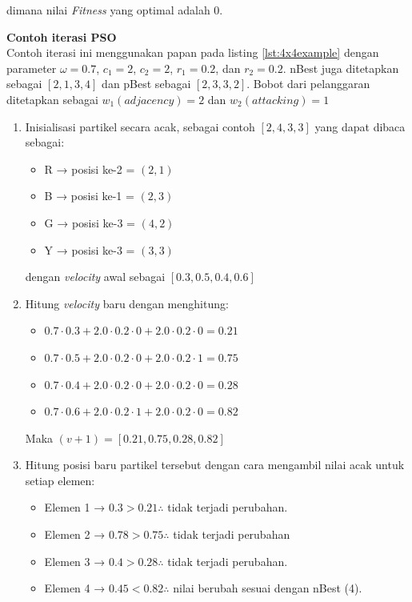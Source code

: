 \documentclass[a4paper,twoside]{article}
\begin{document}
\begin{enumerate}
\begin{enumerate}
		dimana nilai \textit{Fitness} yang optimal adalah 0.
	\end{enumerate}
	\textbf{Contoh iterasi PSO} \\
	Contoh iterasi ini menggunakan papan pada listing {\ref{lst:4x4example}} dengan parameter $\omega = 0.7$, $c_1 = 2$, $c_2 = 2$, $r_1 = 0.2$, dan $r_2 = 0.2$. nBest juga ditetapkan sebagai $[2,1,3,4]$ dan pBest sebagai $[2,3,3,2]$. Bobot dari pelanggaran ditetapkan sebagai $w_1 (adjacency) = 2$ dan $w_2 (attacking) = 1$
	\begin{enumerate}[label=\arabic*.]
		\item Inisialisasi partikel secara acak, sebagai contoh $[2,4,3,3]$ yang dapat dibaca sebagai:
		\begin{itemize}
			\item R → posisi ke-2 = $(2,1)$
			\item B → posisi ke-1 = $(2,3)$
			\item G → posisi ke-3 = $(4,2)$
			\item Y → posisi ke-3 = $(3,3)$
		\end{itemize}
		dengan \textit{velocity} awal sebagai $[0.3,0.5,0.4,0.6]$
		\item Hitung \textit{velocity} baru dengan menghitung: 
		\begin{itemize}
			\item $0.7 \cdot 0.3 + 2.0 \cdot 0.2 \cdot 0 + 2.0 \cdot 0.2 \cdot 0 = 0.21$
			\item $0.7 \cdot 0.5 + 2.0 \cdot 0.2 \cdot 0 + 2.0 \cdot 0.2 \cdot 1 = 0.75$
			\item $0.7 \cdot 0.4 + 2.0 \cdot 0.2 \cdot 0 + 2.0 \cdot 0.2 \cdot 0 = 0.28$
			\item $0.7 \cdot 0.6 + 2.0 \cdot 0.2 \cdot 1 + 2.0 \cdot 0.2 \cdot 0 = 0.82$
		\end{itemize}
		Maka $(v + 1) = [0.21,0.75,0.28,0.82]$
		\item Hitung posisi baru partikel tersebut dengan cara mengambil nilai acak untuk setiap elemen:
		\begin{itemize}
			\item Elemen 1 → $0.3 > 0.21 \therefore$ tidak terjadi perubahan.
			\item Elemen 2 → $0.78 > 0.75 \therefore$ tidak terjadi perubahan
			\item Elemen 3 → $0.4 > 0.28 \therefore$ tidak terjadi perubahan.
			\item Elemen 4 → $0.45 < 0.82 \therefore$ nilai berubah sesuai dengan nBest (4).
		\end{itemize}

\end{enumerate}
\end{enumerate}
\end{document}
